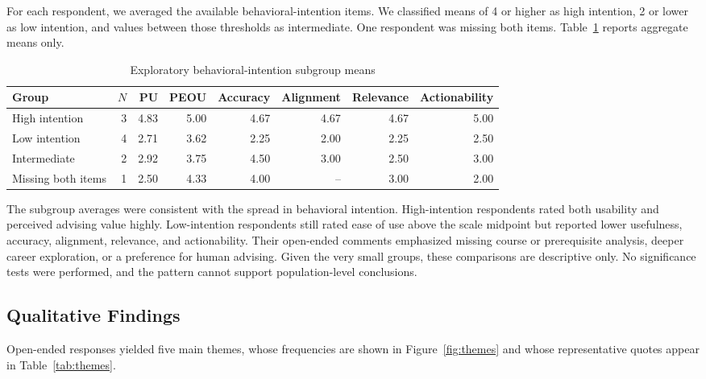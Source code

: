 \documentclass[letterpaper,11pt]{article}
\begin{document}
For each respondent, we averaged the available behavioral-intention items. We classified means of 4 or higher as high intention, 2 or lower as low intention, and values between those thresholds as intermediate. One respondent was missing both items. Table~\ref{tab:subgroups} reports aggregate means only.

\begin{table}[htbp]
\caption{Exploratory behavioral-intention subgroup means}
\label{tab:subgroups}
\centering
\begin{tabular*}{\textwidth}{@{\extracolsep{\fill}}lrrrrrrr@{}}
\toprule
\textbf{Group} & \textbf{$N$} & \textbf{PU} & \textbf{PEOU} & \textbf{Accuracy} & \textbf{Alignment} & \textbf{Relevance} & \textbf{Actionability} \\
\midrule
High intention & 3 & 4.83 & 5.00 & 4.67 & 4.67 & 4.67 & 5.00 \\
Low intention & 4 & 2.71 & 3.62 & 2.25 & 2.00 & 2.25 & 2.50 \\
Intermediate & 2 & 2.92 & 3.75 & 4.50 & 3.00 & 2.50 & 3.00 \\
Missing both items & 1 & 2.50 & 4.33 & 4.00 & -- & 3.00 & 2.00 \\
\bottomrule
\end{tabular*}
\end{table}

The subgroup averages were consistent with the spread in behavioral intention. High-intention respondents rated both usability and perceived advising value highly. Low-intention respondents still rated ease of use above the scale midpoint but reported lower usefulness, accuracy, alignment, relevance, and actionability. Their open-ended comments emphasized missing course or prerequisite analysis, deeper career exploration, or a preference for human advising. Given the very small groups, these comparisons are descriptive only. No significance tests were performed, and the pattern cannot support population-level conclusions.

\subsection{Qualitative Findings}\label{subsec:qualfindings}

Open-ended responses yielded five main themes, whose frequencies are shown in Figure~\ref{fig:themes} and whose representative quotes appear in Table~\ref{tab:themes}.
\end{document}
